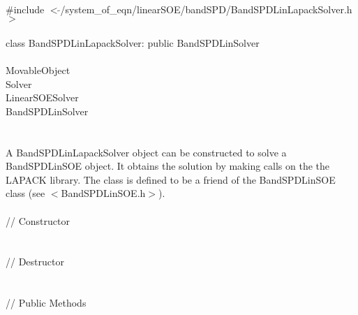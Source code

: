 
   \\
\indent \#include $<\tilde{ }$/system\_of\_eqn/linearSOE/bandSPD/BandSPDLinLapackSolver.h$>$  \\

  \\
\indent class BandSPDLinLapackSolver: public BandSPDLinSolver  \\

 \\
\indent MovableObject \\
\indent\indent  Solver \\
\indent\indent\indent LinearSOESolver \\
\indent\indent\indent\indent BandSPDLinSolver \\
\indent\indent\indent\indent{} \\

  \\
\indent A BandSPDLinLapackSolver object can be constructed to solve
a BandSPDLinSOE object. It obtains the solution by making calls on the
the LAPACK library. The class is defined to be a friend of the 
BandSPDLinSOE class (see $<$BandSPDLinSOE.h$>$). \\


  \\
\indent\indent // Constructor \\
\indent{}  \\ \\
\indent\indent // Destructor \\
\indent{}\\  \\
\indent\indent // Public Methods \\
\indent{} \\
\indent{} \\
\indent{}\\ 
\indent{}\\ 


